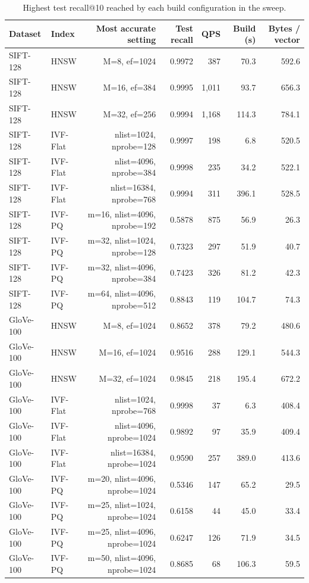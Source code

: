 \begin{table}[t]
\centering
\small
\caption{Highest test recall@10 reached by each build configuration in the sweep.}
\label{tab:t2c_max_recall}
\begin{tabular}{llrrrrr}
\toprule
Dataset & Index & Most accurate setting & Test recall & QPS & Build (s) & Bytes / vector \\
\midrule
SIFT-128 & HNSW & M=8, ef=1024 & 0.9972 & 387 & 70.3 & 592.6 \\
SIFT-128 & HNSW & M=16, ef=384 & 0.9995 & 1,011 & 93.7 & 656.3 \\
SIFT-128 & HNSW & M=32, ef=256 & 0.9994 & 1,168 & 114.3 & 784.1 \\
SIFT-128 & IVF-Flat & nlist=1024, nprobe=128 & 0.9997 & 198 & 6.8 & 520.5 \\
SIFT-128 & IVF-Flat & nlist=4096, nprobe=384 & 0.9998 & 235 & 34.2 & 522.1 \\
SIFT-128 & IVF-Flat & nlist=16384, nprobe=768 & 0.9994 & 311 & 396.1 & 528.5 \\
SIFT-128 & IVF-PQ & m=16, nlist=4096, nprobe=192 & 0.5878 & 875 & 56.9 & 26.3 \\
SIFT-128 & IVF-PQ & m=32, nlist=1024, nprobe=128 & 0.7323 & 297 & 51.9 & 40.7 \\
SIFT-128 & IVF-PQ & m=32, nlist=4096, nprobe=384 & 0.7423 & 326 & 81.2 & 42.3 \\
SIFT-128 & IVF-PQ & m=64, nlist=4096, nprobe=512 & 0.8843 & 119 & 104.7 & 74.3 \\
GloVe-100 & HNSW & M=8, ef=1024 & 0.8652 & 378 & 79.2 & 480.6 \\
GloVe-100 & HNSW & M=16, ef=1024 & 0.9516 & 288 & 129.1 & 544.3 \\
GloVe-100 & HNSW & M=32, ef=1024 & 0.9845 & 218 & 195.4 & 672.2 \\
GloVe-100 & IVF-Flat & nlist=1024, nprobe=768 & 0.9998 & 37 & 6.3 & 408.4 \\
GloVe-100 & IVF-Flat & nlist=4096, nprobe=1024 & 0.9892 & 97 & 35.9 & 409.4 \\
GloVe-100 & IVF-Flat & nlist=16384, nprobe=1024 & 0.9590 & 257 & 389.0 & 413.6 \\
GloVe-100 & IVF-PQ & m=20, nlist=4096, nprobe=1024 & 0.5346 & 147 & 65.2 & 29.5 \\
GloVe-100 & IVF-PQ & m=25, nlist=1024, nprobe=1024 & 0.6158 & 44 & 45.0 & 33.4 \\
GloVe-100 & IVF-PQ & m=25, nlist=4096, nprobe=1024 & 0.6247 & 126 & 71.9 & 34.5 \\
GloVe-100 & IVF-PQ & m=50, nlist=4096, nprobe=1024 & 0.8685 & 68 & 106.3 & 59.5 \\
\bottomrule
\end{tabular}
\end{table}
